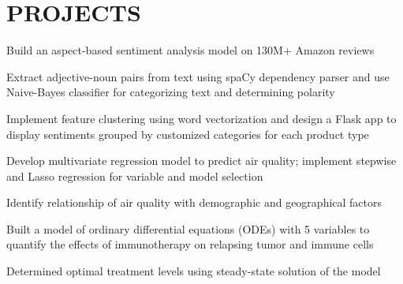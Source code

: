 \documentclass[]{deedy-resume-openfont}
\begin{document}
\begin{minipage}[t]{0.66\textwidth}
\begin{tightemize}
\end{tightemize}
\sectionsep


\section{PROJECTS}
\begin{tightemize}
\item Build an aspect-based sentiment analysis model on 130M+ Amazon reviews
\item Extract adjective-noun pairs from text using spaCy dependency parser and use Naive-Bayes classifier for categorizing text and determining polarity
\item Implement feature clustering using word vectorization and design a Flask app to display sentiments grouped by customized categories for each product type
\end{tightemize}
\sectionsep

\begin{tightemize}
\item Develop multivariate regression model to predict air quality; implement stepwise and Lasso regression for variable and model selection
\item Identify relationship of air quality with demographic and geographical factors 
\end{tightemize}
\sectionsep

\begin{tightemize}
\item Built a model of ordinary differential equations (ODEs) with 5 variables to quantify the effects of immunotherapy on relapsing tumor and immune cells
\item Determined optimal treatment levels using steady-state solution of the model
\end{tightemize}
\sectionsep


\end{minipage}
\end{document}
